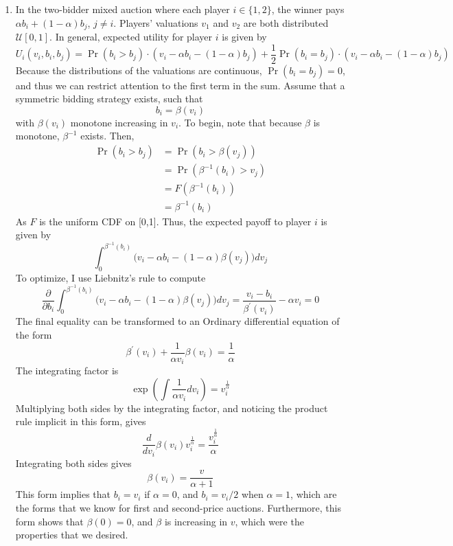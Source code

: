 \documentclass[11pt]{article}
\newcommand{\inv}[1]{#1^{-1}}
\begin{document}
\begin{enumerate}
	\item In the two-bidder mixed auction where each player $ i\in\{1,2\} $, the winner pays $ \alpha b_i + (1 - \alpha)b_{j} $, $ j\neq i $. Players' valuations $ v_1 $ and $ v_2 $ are both distributed $ \mathcal{U}[0,1] $. In general, expected utility for player $ i $ is given by 
	\[U_i(v_i, b_i, b_j) = \Pr(b_i > b_j) \cdot (v_i - \alpha b_i - (1 - \alpha) b_j ) + \frac{1}{2}\Pr(b_i = b_j)\cdot (v_i - \alpha b_i - (1 - \alpha) b_j )\]
	Because the distributions of the valuations are continuous, $ \Pr(b_i = b_j) = 0 $, and thus we can restrict attention to the first term in the sum. Assume that a symmetric bidding strategy exists, such that 
	\[b_i = \beta(v_i)\]
	with $ \beta(v_i) $ monotone increasing in $ v_i $. To begin, note that because $ \beta $ is monotone, $ \inv{\beta} $ exists. Then, 
	\begin{align*}
	\Pr(b_i > b_j) &= \Pr(b_i > \beta(v_j)) \\ &= \Pr(\inv{\beta}(b_i) > v_j) \\ &= F(\inv{\beta}(b_i)) \\
	&= \inv{\beta}(b_i)
	\end{align*}
	 As $ F $ is the uniform CDF on [0,1]. Thus, the expected payoff to player $ i $ is given by 
	 \[\int_{0}^{\inv{\beta}(b_i)} \big(v_i - \alpha b_i - (1 - \alpha) \beta(v_j) \big)dv_j \]
	 To optimize, I use Liebnitz's rule to compute 
	 \[\frac{\partial }{\partial b_i} \int_{0}^{\inv{\beta}(b_i)} \big(v_i - \alpha b_i - (1 - \alpha) \beta(v_j) \big)dv_j = \frac{v_i - b_i}{\beta^\prime(v_i)} - \alpha v_i  = 0\]
	The final equality can be transformed to an Ordinary differential equation of the form
	\[\beta^\prime(v_i) + \frac{1}{\alpha v_i} \beta(v_i) = \frac{1}{\alpha}\]
	The integrating factor is $  $
	\[\exp\left(\int \frac{1}{\alpha v_i} dv_i\right) = v_i^{\frac{1}{\alpha}}\]
	Multiplying both sides by the integrating factor, and noticing the product rule implicit in this form, gives 
	\[\frac{d}{d v_i}\beta(v_i)v_i^{\frac{1}{\alpha}} =  \frac{v_i^{\frac{1}{\alpha}}}{\alpha} \]
	Integrating both sides gives 
	\[\beta (v_i) = \frac{v}{\alpha + 1}\]
	This form implies that $ b_i = v_i $ if $\alpha = 0 $, and $ b_i = v_i/2 $ when $ \alpha = 1 $, which are the forms that we know for first and second-price auctions. Furthermore, this form shows that $ \beta (0) = 0 $, and $ \beta $ is increasing in $ v $, which were the properties that we desired.  
	

\end{enumerate}
\end{document}
